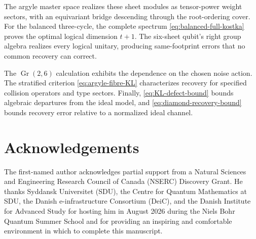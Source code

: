 \documentclass[11pt]{article}
\theoremstyle{definition}
\theoremstyle{remark}
\newcommand{\Gr}{\operatorname{Gr}}
\begin{document}
The argyle master space realizes these sheet modules as tensor-power weight sectors, with an equivariant bridge descending through the root-ordering cover.  For the balanced three-cycle, the complete spectrum \eqref{eq:balanced-full-kostka} proves the optimal logical dimension $t+1$.  The six-sheet qubit's right group algebra realizes every logical unitary, producing same-footprint errors that no common recovery can correct.

The $\Gr(2,6)$ calculation exhibits the dependence on the chosen noise action.  The stratified criterion \eqref{eq:argyle-fibre-KL} characterizes recovery for specified collision operators and type sectors.  Finally, \eqref{eq:KL-defect-bound} bounds algebraic departures from the ideal model, and \eqref{eq:diamond-recovery-bound} bounds recovery error relative to a normalized ideal channel.

\section*{Acknowledgements}

The first-named author acknowledges partial support from a Natural Sciences and Engineering Research Council of Canada (NSERC) Discovery Grant.  He thanks Syddansk Universitet (SDU), the Centre for Quantum Mathematics at SDU, the Danish e-infrastructure Consortium (DeiC), and the Danish Institute for Advanced Study for hosting him in August 2026 during the Niels Bohr Quantum Summer School and for providing an inspiring and comfortable environment in which to complete this manuscript.
\end{document}
